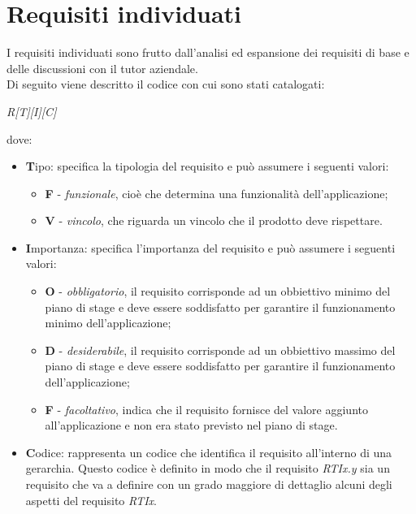 \newpage
\section{Requisiti individuati}
I requisiti individuati sono frutto dall'analisi ed espansione dei requisiti di base e delle discussioni con il tutor aziendale.\\
Di seguito viene descritto il codice con cui sono stati catalogati:
\begin{center}
	\textit{R[T][I][C]}
\end{center}
dove:
\begin{itemize}
	\item \textbf{T}ipo: specifica la tipologia del requisito e può assumere i seguenti valori:
	\begin{itemize}
		\item \textbf{F} - \textit{funzionale}, cioè che determina una funzionalità dell'applicazione;
		\item \textbf{V} - \textit{vincolo}, che riguarda un vincolo che il prodotto deve rispettare.
	\end{itemize}
	\item \textbf{I}mportanza: specifica l'importanza del requisito e può assumere i seguenti valori:
	\begin{itemize}
		\item \textbf{O} - \textit{obbligatorio}, il requisito corrisponde ad un obbiettivo minimo del piano di stage e deve essere soddisfatto per garantire il funzionamento minimo dell'applicazione;
		\item \textbf{D} - \textit{desiderabile}, il requisito corrisponde ad un obbiettivo massimo del piano di stage e deve essere soddisfatto per garantire il funzionamento dell'applicazione;
		\item \textbf{F} - \textit{facoltativo}, indica che il requisito fornisce del valore aggiunto all'applicazione e non era stato previsto nel piano di stage.
	\end{itemize}
	\item \textbf{C}odice: rappresenta un codice che identifica il requisito all'interno di una gerarchia. Questo codice è definito in modo che il requisito \textit{RTIx.y} sia un requisito che va a definire con un grado maggiore di dettaglio alcuni degli aspetti del requisito \textit{RTIx}.
\end{itemize}



